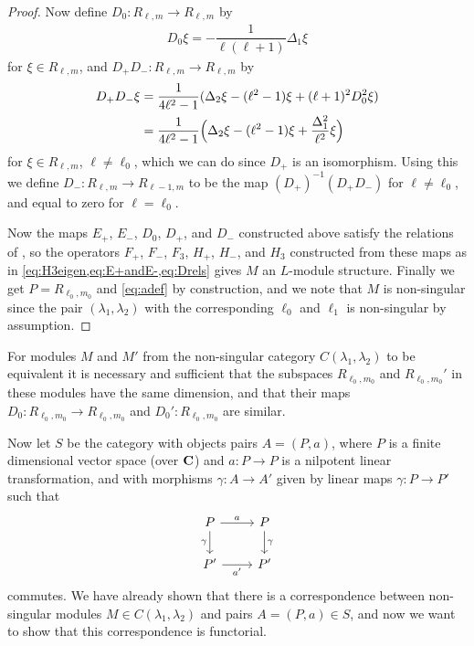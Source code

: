 \begin{proof}
  Now define $D_0\colon R_{\ell,m}\to R_{\ell,m}$ by 
  \begin{align*}
    D_0\xi = -\dfrac{1}{\ell(\ell+1)}\Delta_1 \xi
  \end{align*}
  for $\xi\in R_{\ell,m}$, and $D_+D_-\colon R_{\ell,m}\to R_{\ell,m}$ by 
  \begin{align*}
    D_+D_-\xi &= \dfrac{1}{4\ell^2-1}(\Delta_2\xi - (\ell^2-1)\xi + (\ell+1)^2D_0^2\xi) \\
    &= \dfrac{1}{4\ell^2-1}\Bigl(\Delta_2\xi - (\ell^2-1)\xi + \dfrac{\Delta_1^2}{\ell^2}\xi\Bigr)
  \end{align*}
  for $\xi \in R_{\ell,m}$, $\ell\neq \ell_0$, which we can do since $D_+$ is an isomorphism. Using this we define $D_-\colon R_{\ell,m}\to R_{\ell-1,m}$ to be the map $(D_+)^{-1}(D_+D_-)$ for $\ell\neq \ell_0$, and equal to zero for $\ell=\ell_0$. 

  Now the maps $E_+$, $E_-$, $D_0$, $D_+$, and $D_-$ constructed above satisfy the relations of ,  so the operators $F_+$, $F_-$, $F_3$, $H_+$, $H_-$, and $H_3$ constructed from these maps as in \cref{eq:H3eigen,eq:E+andE-,eq:Drels} gives $M$ an $L$-module structure. Finally we get $P=R_{\ell_0,m_0}$ and \cref{eq:adef} by construction, and we note that $M$ is non-singular since the pair $(\lambda_1,\lambda_2)$ with the corresponding $\ell_0$ and $\ell_1$ is non-singular by assumption.
\end{proof}

\begin{corollary}
  For modules $M$ and $M'$ from the non-singular category $C(\lambda_1,\lambda_2)$ to be equivalent it is necessary and sufficient that the subspaces $R_{\ell_0,m_0}$ and $R_{\ell_0,m_0}'$ in these modules have the same dimension, and that their maps $D_0\colon R_{\ell_0,m_0}\to R_{\ell_0,m_0}$ and $D_0'\colon R_{\ell_0,m_0}$ are similar. 
\end{corollary}

Now let $S$ be the category with objects pairs $A=(P,a)$, where $P$ is a finite dimensional vector space (over $\mathbf{C}$) and $a\colon P\to P$ is a nilpotent linear transformation, and with morphisms $\gamma\colon A\to A'$ given by linear maps $\gamma\colon P\to P'$ such that
\[
  \begin{tikzcd}
    P\ar[r,"a"] \ar[d,"\gamma",swap] & P \ar[d,"\gamma"] \\
    P' \ar[r,"a'",swap] & P'
  \end{tikzcd}
\]
commutes. We have already shown that there is a correspondence between non-singular modules $M\in C(\lambda_1,\lambda_2)$ and pairs $A=(P,a)\in S$, and now we want to show that this correspondence is functorial.

